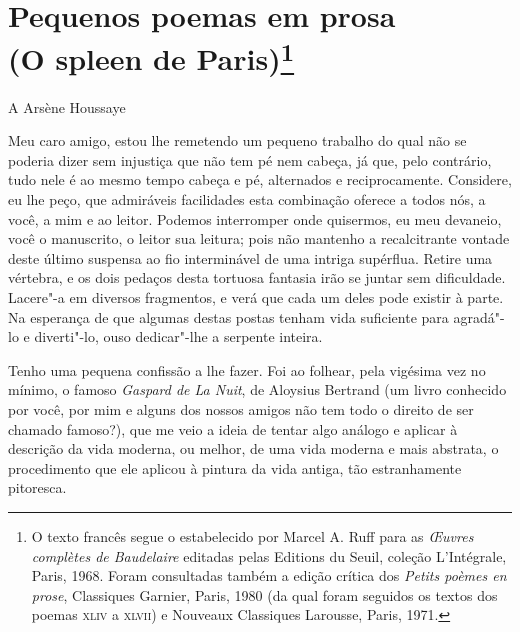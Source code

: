﻿


\chapter[Pequenos poemas em prosa]{Pequenos poemas em prosa\\ (O spleen de Paris)\footnote[*]{O texto francês segue o estabelecido por Marcel A. Ruff para as \emph{\OE uvres complètes de Baudelaire} editadas pelas Editions du Seuil, coleção L'Intégrale, Paris, 1968. Foram consultadas também a edição crítica dos \emph{Petits poèmes en prose}, Classiques Garnier, Paris, 1980 (da qual foram seguidos os textos dos poemas \textsc{xliv} a \textsc{xlvii}) e Nouveaux Classiques Larousse, Paris, 1971.}}

\forceindent{}A Arsène Houssaye 


Meu caro amigo, estou lhe remetendo um pequeno trabalho do qual não se poderia dizer sem
injustiça que não tem pé nem cabeça, já que, pelo contrário, tudo nele
é ao mesmo tempo cabeça e pé, alternados e reciprocamente. Considere, eu
lhe peço, que admiráveis facilidades esta combinação oferece a todos
nós, a você, a mim e ao leitor. Podemos interromper onde quisermos, eu
meu devaneio, você o manuscrito, o leitor sua leitura; pois não
mantenho a recalcitrante vontade deste último suspensa ao fio
interminável de uma intriga supérflua. Retire uma vértebra, e os dois
pedaços desta tortuosa fantasia irão se juntar sem dificuldade.
Lacere"-a em diversos fragmentos, e verá que cada um deles pode
existir à parte. Na esperança de que algumas destas postas tenham vida
suficiente para agradá"-lo e diverti"-lo, ouso dedicar"-lhe a
serpente inteira.

Tenho uma pequena confissão a lhe fazer. Foi ao folhear, pela vigésima
vez no mínimo, o famoso \textit{Gaspard de La Nuit}, de Aloysius Bertrand (um
livro conhecido por você, por mim e alguns dos nossos amigos não
tem todo o direito de ser chamado famoso?), que me veio a ideia de
tentar algo análogo e aplicar à descrição da vida moderna, ou
melhor, de uma vida moderna e mais abstrata, o procedimento que ele
aplicou à pintura da vida antiga, tão estranhamente pitoresca.

